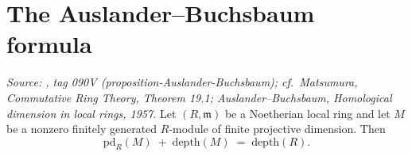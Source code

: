\section{The Auslander--Buchsbaum formula}
\label{mk-sec:ab_main}

\begin{theorem}\label{mk-thm:auslander_buchsbaum}
  \leanok


  \textit{Source: \cite{stacks-project}, tag 090V (proposition-Auslander-Buchsbaum); cf.\
  Matsumura, \emph{Commutative Ring Theory}, Theorem 19.1; Auslander--Buchsbaum,
  \emph{Homological dimension in local rings}, 1957.}
  Let \((R, \mathfrak{m})\) be a Noetherian local ring and let \(M\) be a nonzero finitely
  generated \(R\)-module of finite projective dimension. Then
  \[
    \text{pd}_R(M) \;+\; \text{depth}(M) \;=\; \text{depth}(R).
  \]
\end{theorem}

